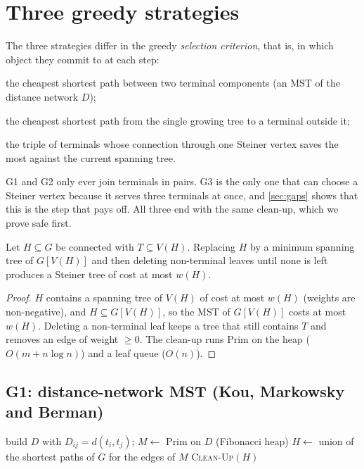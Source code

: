\section{Three greedy strategies}\label{sec:greedy}

The three strategies differ in the greedy \emph{selection criterion}, that is, in which object they commit to at each step:
\begin{description}[leftmargin=1.2cm,style=nextline]
\item[G1] the cheapest shortest path between two terminal components (an MST of the distance network \(D\));
\item[G2] the cheapest shortest path from the single growing tree to a terminal outside it;
\item[G3] the triple of terminals whose connection through one Steiner vertex saves the most against the current
spanning tree.
\end{description}
G1 and G2 only ever join terminals in pairs. G3 is the only one that can choose a Steiner vertex because it serves
three terminals at once, and \cref{sec:gaps} shows that this is the step that pays off. All three end with the same
clean-up, which we prove safe first.

\begin{lemma}[clean-up]\label{lem:cleanup}
Let \(H\subseteq G\) be connected with \(T\subseteq V(H)\). Replacing \(H\) by a minimum spanning tree of
\(G[V(H)]\) and then deleting non-terminal leaves until none is left produces a Steiner tree of cost at most \(w(H)\).
\end{lemma}
\begin{proof}
\(H\) contains a spanning tree of \(V(H)\) of cost at most \(w(H)\) (weights are non-negative), and \(H\subseteq G[V(H)]\), so
the MST of \(G[V(H)]\) costs at most \(w(H)\). Deleting a non-terminal leaf keeps a tree that still contains \(T\) and removes
an edge of weight \(\ge0\). The clean-up runs Prim on the heap (\(O(m+n\log n)\)) and a leaf queue (\(O(n)\)).
\end{proof}

\subsection{G1: distance-network MST (Kou, Markowsky and Berman)}
\begin{algorithm}[!htbp]
build \(D\) with \(D_{ij}=d(t_i,t_j)\); \(M\gets\) Prim on \(D\) (Fibonacci heap)\;
\(H\gets\) union of the shortest paths of \(G\) for the edges of \(M\)\;
\Return \textsc{Clean-Up}\((H)\)\;
\caption{G1 (\texttt{src/greedy1\_kmb.cpp}).}
\end{algorithm}

